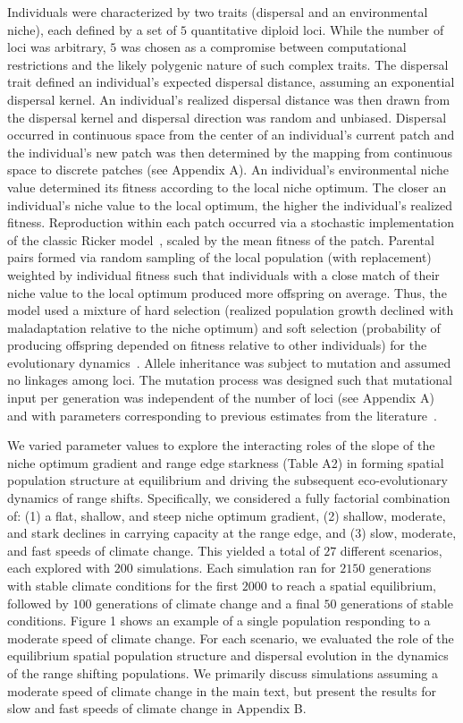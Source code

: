 \documentclass[11pt]{article}
\begin{document}
Individuals were characterized by two traits (dispersal and an environmental niche), each defined by a set of $5$ quantitative diploid loci. While the number of loci was arbitrary, $5$ was chosen as a compromise between computational restrictions and the likely polygenic nature of such complex traits. The dispersal trait defined an individual's expected dispersal distance, assuming an exponential dispersal kernel. An individual's realized dispersal distance was then drawn from the dispersal kernel and dispersal direction was random and unbiased. Dispersal occurred in continuous space from the center of an individual's current patch and the individual's new patch was then determined by the mapping from continuous space to discrete patches (see Appendix A). An individual's environmental niche value determined its fitness according to the local niche optimum. The closer an individual's niche value to the local optimum, the higher the individual's realized fitness. Reproduction within each patch occurred via a stochastic implementation of the classic Ricker model~\citep{ricker1954stock, melbourne2008extinction}, scaled by the mean fitness of the patch. Parental pairs formed via random sampling of the local population (with replacement) weighted by individual fitness such that individuals with a close match of their niche value to the local optimum produced more offspring on average. Thus, the model used a mixture of  hard selection (realized population growth declined with maladaptation relative to the niche optimum) and soft selection (probability of producing offspring depended on fitness relative to other individuals) for the evolutionary dynamics~\citep{wallace1975hard}. Allele inheritance was subject to mutation and assumed no linkages among loci. The mutation process was designed such that mutational input per generation was independent of the number of loci (see Appendix A) and with parameters corresponding to previous estimates from the literature~\citep{gilbert2017local}.

We varied parameter values to explore the interacting roles of the slope of the niche optimum gradient and range edge starkness (Table A2) in forming spatial population structure at equilibrium and driving the subsequent eco-evolutionary dynamics of range shifts. Specifically, we considered a fully factorial combination of: (1) a flat, shallow, and steep niche optimum gradient, (2) shallow, moderate, and stark declines in carrying capacity at the range edge, and (3) slow, moderate, and fast speeds of climate change. This yielded a total of $27$ different scenarios, each explored with $200$ simulations. Each simulation ran for $2150$ generations with stable climate conditions for the first $2000$ to reach a spatial equilibrium, followed by $100$ generations of climate change and a final $50$ generations of stable conditions. Figure 1 shows an example of a single population responding to a moderate speed of climate change. For each scenario, we evaluated the role of the equilibrium spatial population structure and dispersal evolution in the dynamics of the range shifting populations. We primarily discuss simulations assuming a moderate speed of climate change in the main text, but present the results for slow and fast speeds of climate change in Appendix B.
\end{document}
